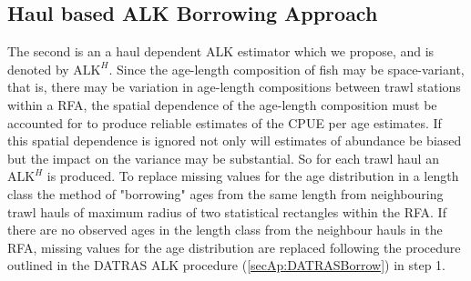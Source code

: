 \documentclass[a4paper 12pt]{article}
\numberwithin{equation}{section}
\begin{document}
{\subsection{\normalsize Haul based ALK Borrowing Approach}
\label{secAp:oursBorrow}
\indent  The second is an a haul dependent ALK estimator which we propose, and is denoted by $\mathrm{ALK}^{H}$. Since the age-length composition of fish may be space-variant, that is, there may be variation in age-length compositions between trawl stations within a RFA, the spatial dependence of the age-length composition must be accounted for to produce reliable estimates of the CPUE per age estimates. If this spatial dependence is ignored not only will estimates of abundance be biased but the impact on the variance may be substantial. So for each trawl haul an $\mathrm{ALK}^{H}$ is produced. To replace missing values for the age distribution in a length class the method of "borrowing" ages from the same length  from neighbouring trawl hauls of maximum radius of two statistical rectangles within the RFA. If there are no observed ages in the length class from the neighbour hauls in the RFA, missing values for the age distribution are replaced following the procedure outlined in the DATRAS ALK procedure (\ref{secAp:DATRASBorrow}) in step 1. 



}
\end{document}
